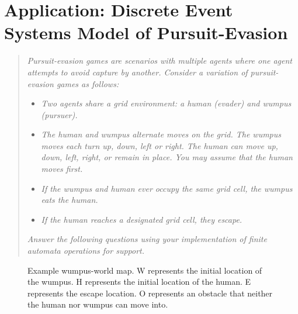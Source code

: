 \documentclass[12pt,letterpaper]{ntdhw}
\begin{document}
\clearpage

\section*{Application: Discrete Event Systems Model of Pursuit-Evasion}

\begin{quote}

\emph{\emph{Pursuit-evasion games} are scenarios with multiple agents
  where one agent attempts to avoid capture by another.  Consider a
  variation of pursuit-evasion games as follows:}

\begin{itemize}
  \item \it Two agents share a grid environment: a human (evader) and wumpus
  (pursuer).
  \item \it The human and wumpus alternate moves on the grid.  The
  wumpus moves each turn up, down, left or right.  The human can move
  up, down, left, right, or remain in place.  You may assume that the
  human moves first.
  \item \it If the wumpus and human ever occupy the same grid cell,
  the wumpus eats the human.
  \item \it If the human reaches a designated grid cell, they escape.
\end{itemize}

\emph{Answer the following questions using your implementation of finite
automata operations for support.}

\end{quote}
\bigskip
{}

\begin{figure}[b]
  \centering
  \caption{Example wumpus-world map.  W represents the initial
    location of the wumpus.  H represents the initial location of the
    human.  E represents the escape location.  O represents an
    obstacle that neither the human nor wumpus can move into.}
  \label{fig:map}
\end{figure}

\clearpage
\end{document}
